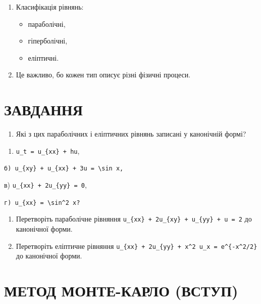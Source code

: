 \documentclass[
  ukrainian,
]{article}
\providecommand{\tightlist}{%
  \setlength{\itemsep}{0pt}\setlength{\parskip}{0pt}}
\begin{document}
\begin{enumerate}
\def\labelenumi{\arabic{enumi}.}
\tightlist
\item
  Класифікація рівнянь:

  \begin{itemize}
  \tightlist
  \item
    параболічні,
  \item
    гіперболічні,
  \item
    еліптичні.
  \end{itemize}
\item
  Це важливо, бо кожен тип описує різні фізичні процеси.
\end{enumerate}

\section{ЗАВДАННЯ}\label{ux437ux430ux432ux434ux430ux43dux43dux44f-8}

\begin{enumerate}
\def\labelenumi{\arabic{enumi}.}
\tightlist
\item
  Які з цих параболічних і еліптичних рівнянь записані у канонічній
  формі?
\end{enumerate}

\begin{enumerate}
\def\labelenumi{\alph{enumi})}
\tightlist
\item
  \texttt{u\_t\ =\ u\_\{xx\}\ +\ hu},
\end{enumerate}

\texttt{б)\ \textquotesingle{}u\_\{xy\}\ +\ u\_\{xx\}\ +\ 3u\ =\ \textbackslash{}sin\ x\textquotesingle{},}

в) \texttt{u\_\{xx\}\ +\ 2u\_\{yy\}\ =\ 0},

\texttt{г)\ \textquotesingle{}u\_\{xx\}\ =\ \textbackslash{}sin\^{}2\ x\textquotesingle{}?}

\begin{enumerate}
\def\labelenumi{\arabic{enumi}.}
\setcounter{enumi}{1}
\item
  Перетворіть параболічне рівняння
  \texttt{u\_\{xx\}\ +\ 2u\_\{xy\}\ +\ u\_\{yy\}\ +\ u\ =\ 2} до
  канонічної форми.
\item
  Перетворіть еліптичне рівняння
  \texttt{u\_\{xx\}\ +\ 2u\_\{yy\}\ +\ x\^{}2\ u\_x\ =\ e\^{}\{-x\^{}2/2\}}
  до канонічної форми.
\end{enumerate}

\section{МЕТОД МОНТЕ-КАРЛО
(ВСТУП)}\label{ux43cux435ux442ux43eux434-ux43cux43eux43dux442ux435-ux43aux430ux440ux43bux43e-ux432ux441ux442ux443ux43f}
\end{document}
